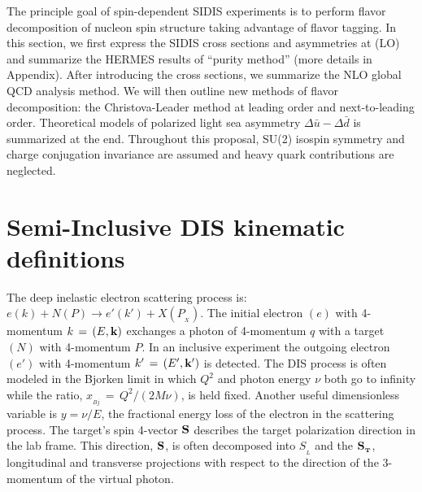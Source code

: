 
The principle goal of spin-dependent SIDIS experiments is to perform flavor 
decomposition of nucleon spin structure taking advantage of flavor tagging. 
In this section, we first express the SIDIS cross sections and asymmetries at 
\lo (LO) and summarize the HERMES results of ``purity method'' (more details
 in Appendix). After introducing the \nlo cross sections, we 
 summarize the NLO global QCD analysis method. 
We will then outline new methods of flavor decomposition:
the Christova-Leader method at leading order and next-to-leading order.
Theoretical models
of polarized light sea asymmetry $\Delta \bar{u}-\Delta \bar{d}$ is summarized at the end.
Throughout this proposal, SU(2) isospin symmetry and charge conjugation invariance are  
assumed and heavy quark contributions are neglected.

\section{Semi-Inclusive DIS kinematic definitions}
%
The deep inelastic electron scattering process is: 
$e(k) + N(P) \rightarrow e'(k') + X(P_{_X})$.
The initial electron $(e)$ with 4-momentum $k \,=\, (E, {\bf k})$ exchanges 
a photon of 4-momentum $q$ with a target $(N)$ with 4-momentum $P$.
In an inclusive experiment the outgoing electron $(e')$ with 4-momentum 
$k' \,=\, (E', {\bf k'})$ is detected. 
The DIS process is often modeled in the Bjorken limit in which $Q^2$ and photon
energy $\nu$ both go 
to infinity while the ratio, $x_{_{Bj}} \,=\, Q^2/(2M\nu)$, is held fixed.
Another useful dimensionless variable is $y= \nu/E$, the fractional energy
loss of the electron in the scattering process.
The target's spin 4-vector ${\bf S}$ describes the target polarization direction in the lab
frame.
This direction, ${\bf S}$, is often decomposed into $S_{_L}$ and the ${\bf S_{_T}}$,
longitudinal and transverse projections  
with respect to the direction of the 3-momentum of the virtual photon.
%

